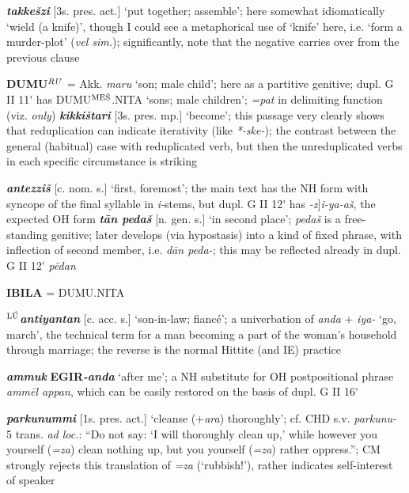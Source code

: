 \documentclass[10pt]{article}
\newcommand{\supersc}[1]{$^{\textrm{\scriptsize{#1}}}$}  	%
\newcommand{\bit}[1]{\textbf{\textit{#1}}}				%
\newcommand{\p}[1]{{\tiny[{#1}]}}					%
\newcommand{\pr}{\'{ }}									%
\newcommand{\hith}{\textsubwedge{h}}
\newcommand{\man}{\supersc{L\'U}}
\newcommand{\mpl}{\supersc{ME\v{S}}}
\renewcommand{\.}[1]{\textsubdot{#1}}
\begin{document}
\begin{description}
\item[35 :] \bit{takke\v{s}zi} \p{3s. pres. act.} `put together; assemble'; here somewhat idiomatically `wield (a knife)', though I could see a metaphorical use of `knife' here, i.e. `form a murder-plot' (\textit{vel sim.}); significantly, note that the negative carries over  from the previous clause

\item[36 :] \textbf{DUMU\supersc{\textit{RU}}} = Akk. \textit{maru} `son; male child'; here as a partitive genitive; dupl. G II 11{\pr} has DUMU\mpl.NITA `sons; male children'; \textit{=pat} in delimiting function (viz. \textit{only}) \bit{kikki\v{s}tari} \p{3s. pres. mp.} `become'; this passage very clearly shows that reduplication can indicate iterativity (like \textit{*-ske-}); the contrast between the general (habitual) case with reduplicated verb, but then the unreduplicated verbs in each specific circumstance is striking

\item[37 :] \bit{{\hith}antezzi\v{s}} \p{c. nom. s.} `first, foremost'; the main text has the NH form with syncope of the final syllable in \textit{i-}stems, but dupl. G II 12{\pr} has \textit{-z}]\textit{i-ya-a\v{s}}, the expected OH form \bit{t\=an peda\v{s}} \p{n. gen. s.} `in second place'; \textit{peda\v{s}} is a free-standing genitive; later develops (via hypostasis) into a kind of fixed phrase, with inflection of second member, i.e. \textit{d\=an peda-}; this may be reflected already in dupl. G II 12{\pr} \textit{p\=edan}

\item[38 :] \textbf{IBILA} = DUMU.NITA

\item[39 :] \textbf{\man}\bit{antiyantan} \p{c. acc. s.} `son-in-law; fianc\'e'; a univerbation of \textit{anda} + \textit{iya-} `go, march', the technical term for a man becoming a part of the woman's household through marriage; the reverse is the normal Hittite (and IE) practice

\item \bit{ammuk} \textbf{EGIR}\bit{-anda} `after me'; a NH substitute for OH postpositional phrase \textit{amm\=el appan}, which can be easily restored on the basis of dupl. G II 16{\pr}

\item[43 :] \bit{parkunummi} \p{1s. pres. act.} `cleanse (+\textit{ar{\hith}a}) thoroughly'; cf. CHD s.v. \textit{parkunu-} 5 trans. \textit{ad loc.}: ``Do not say: `I will thoroughly clean up,' while however you yourself (\textit{=za}) clean nothing up, but you yourself (\textit{=za}) rather oppress.''; CM strongly rejects this translation of \textit{=za} (`rubbish!'), rather indicates self-interest of speaker


\end{description}
\end{document}
